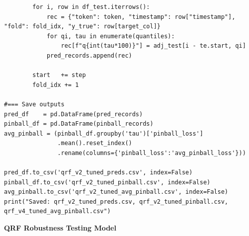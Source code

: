 \documentclass[
  a4paper,
  DIV=11,
  numbers=noendperiod]{scrreprt}
\begin{document}
\begin{verbatim}
        for i, row in df_test.iterrows():
            rec = {"token": token, "timestamp": row["timestamp"], "fold": fold_idx, "y_true": row[target_col]}
            for qi, tau in enumerate(quantiles):
                rec[f"q{int(tau*100)}"] = adj_test[i - te.start, qi]
            pred_records.append(rec)

        start   += step
        fold_idx += 1

#=== Save outputs 
pred_df    = pd.DataFrame(pred_records)
pinball_df = pd.DataFrame(pinball_records)
avg_pinball = (pinball_df.groupby('tau')['pinball_loss']
               .mean().reset_index()
               .rename(columns={'pinball_loss':'avg_pinball_loss'}))

pred_df.to_csv('qrf_v2_tuned_preds.csv', index=False)
pinball_df.to_csv('qrf_v2_tuned_pinball.csv', index=False)
avg_pinball.to_csv('qrf_v2_tuned_avg_pinball.csv', index=False)
print("Saved: qrf_v2_tuned_preds.csv, qrf_v2_tuned_pinball.csv, qrf_v4_tuned_avg_pinball.csv")
\end{verbatim}

\textbf{QRF Robustness Testing Model}
\end{document}
